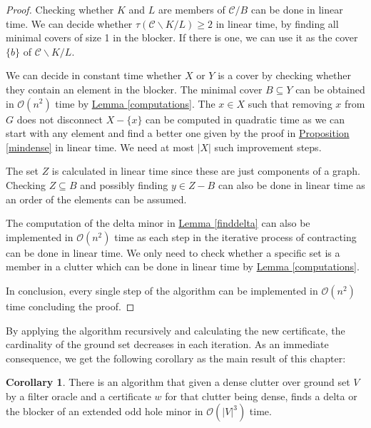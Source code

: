 \documentclass[a4paper, 12pt]{scrbook}
\theoremstyle{definition}
\newtheorem{corollary}[theorem]{Corollary}
\begin{document}
\begin{proof}
       Checking whether $K$ and $L$ are members of $\mathcal{C}/B$ can be done in linear time.
       We can decide whether $\tau(\mathcal{C}\backslash K / L)\geq 2$ in linear time, by finding all minimal covers of size 1 in the blocker. If there is one, we can use it as the cover $\{b\}$ of $\mathcal{C}\backslash K / L$.

       We can decide in constant time whether $X$ or $Y$ is a cover by checking whether they contain an element in the blocker.
       The minimal cover $B \subseteq Y$ can be obtained in $\mathcal{O}(n^2)$ time by \hyperref[computations]{Lemma \ref*{computations}}.
       The $x \in X$ such that removing $x$ from $G$ does not disconnect $X - \{x\}$ can be computed in quadratic time as we can start with any element and find a better one given by the proof in \hyperref[mindense]{Proposition \ref*{mindense}} in linear time. We need at most $|X|$ such improvement steps.

       The set $Z$ is calculated in linear time since these are just components of a graph.
       Checking $Z \subseteq B$ and possibly finding $y \in Z-B$ can also be done in linear time as an order of the elements can be assumed.

       The computation of the delta minor in \hyperref[finddelta]{Lemma \ref*{finddelta}} can also be implemented in $\mathcal{O}(n^2)$ time as each step in the iterative process of contracting can be done in linear time. We only need to check whether a specific set is a member in a clutter which can be done in linear time by \hyperref[computations]{Lemma \ref*{computations}}.

       In conclusion, every single step of the algorithm can be implemented in $\mathcal{O}(n^2)$ time concluding the proof.
   \end{proof}

   By applying the algorithm recursively and calculating the new certificate, the cardinality of the ground set decreases in each iteration. As an immediate consequence, we get the following corollary as the main result of this chapter:

   \begin{corollary}
       There is an algorithm that given a dense clutter over ground set $V$ by a filter oracle and a certificate $w$ for that clutter being dense, finds a delta or the blocker of an extended odd hole minor in $\mathcal{O}(|V|^3)$ time.
   \end{corollary}
\end{document}
